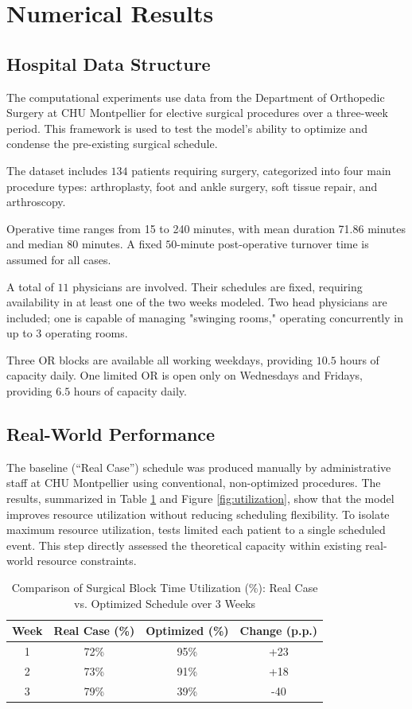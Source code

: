 \section{Numerical Results}\label{sec:numerical_results}
\subsection{Hospital Data Structure}
The computational experiments use data from the Department of Orthopedic Surgery at CHU Montpellier for elective surgical procedures over a three-week period. This framework is used to test the model's ability to optimize and condense the pre-existing surgical schedule.

The dataset includes $134$ patients requiring surgery, categorized into four main procedure types: arthroplasty, foot and ankle surgery, soft tissue repair, and  arthroscopy.

Operative time ranges from 15 to 240 minutes, with mean duration 71.86 minutes and median 80 minutes. A fixed $50$-minute post-operative turnover time is assumed for all cases.

A total of $11$ physicians are involved. Their schedules are fixed, requiring availability in at least one of the two weeks modeled. Two head physicians are included; one is capable of managing "swinging rooms," operating concurrently in up to $3$ operating rooms.

Three OR blocks are available all working weekdays, providing $10.5$ hours of capacity daily. One limited OR is open only on Wednesdays and Fridays, providing $6.5$ hours of capacity daily.

\subsection{Real-World Performance}

The baseline (``Real Case'') schedule was produced manually by administrative staff at CHU Montpellier using conventional, non-optimized procedures. The results, summarized in Table \ref{tab:utilization} and Figure \ref{fig:utilization}, show that the model improves resource utilization without reducing scheduling flexibility. To isolate maximum resource utilization, tests limited each patient to a single scheduled event. This step directly assessed the theoretical capacity within existing real-world resource constraints.
\begin{table}[htb]
\centering
\caption{Comparison of Surgical Block Time Utilization (\%): Real Case vs. Optimized Schedule over 3 Weeks}
\label{tab:utilization}
\begin{tabular}{cccc}
\toprule
\textbf{Week} & \textbf{Real Case (\%)} & \textbf{Optimized (\%)} & \textbf{Change (p.p.)} \\
\midrule
1 & 72\% & 95\% & +23 \\
2 & 73\% & 91\% & +18 \\
3 & 79\% & 39\% & -40 \\
\bottomrule
\end{tabular}
\end{table}

